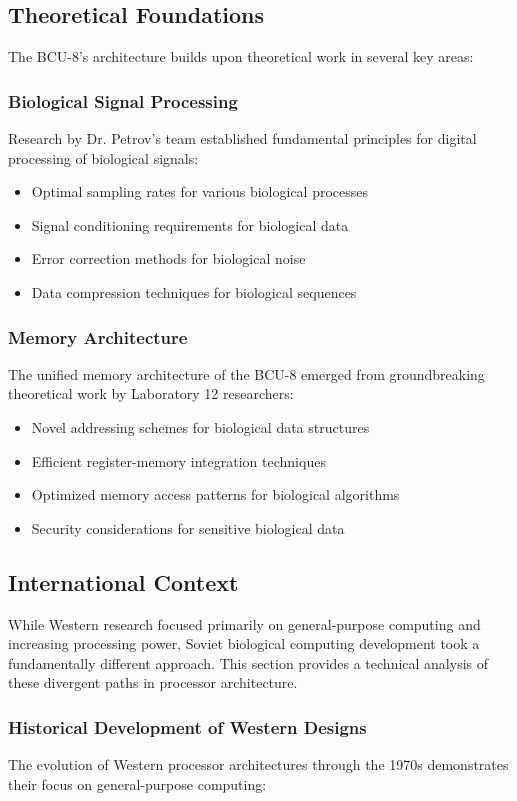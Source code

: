 \documentclass[12pt]{article}
\begin{document}
\subsection{Theoretical Foundations}
The BCU-8's architecture builds upon theoretical work in several key areas:

\subsubsection{Biological Signal Processing}
Research by Dr. Petrov's team established fundamental principles for digital processing of biological signals:
\begin{itemize}
    \item Optimal sampling rates for various biological processes
    \item Signal conditioning requirements for biological data
    \item Error correction methods for biological noise
    \item Data compression techniques for biological sequences
\end{itemize}

\subsubsection{Memory Architecture}
The unified memory architecture of the BCU-8 emerged from groundbreaking theoretical work by Laboratory 12 researchers:
\begin{itemize}
    \item Novel addressing schemes for biological data structures
    \item Efficient register-memory integration techniques
    \item Optimized memory access patterns for biological algorithms
    \item Security considerations for sensitive biological data
\end{itemize}

\subsection{International Context}
While Western research focused primarily on general-purpose computing and increasing processing power, Soviet biological computing development took a fundamentally different approach. This section provides a technical analysis of these divergent paths in processor architecture.

\subsubsection{Historical Development of Western Designs}
The evolution of Western processor architectures through the 1970s demonstrates their focus on general-purpose computing:
\end{document}
